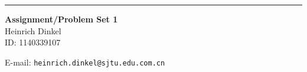 \documentclass{article}
\begin{document}
\begin{CJK}{UTF8}{gbsn}


\hrule

\newcommand*{\ii}{\imath}%
\vspace{0.4in}
\begin{center}
{\bf Assignment/Problem Set 1\\}
\bigskip
Heinrich Dinkel\\
ID: 1140339107\\
\smallskip
\date
\bigskip

E-mail: {\tt heinrich.dinkel@sjtu.edu.com.cn}\\

\end{center}

\newcommand{\ppath}{.}


%
\newpage
\end{CJK}
\end{document}
